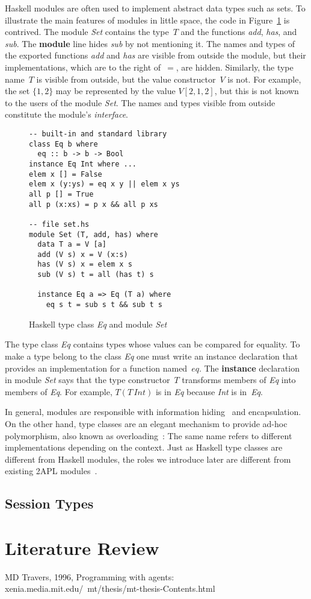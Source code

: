 \documentclass[a4paper,12pt,oneside]{book} %
\theoremstyle{remark}
\theoremstyle{plain}
\begin{document}
Haskell modules are often used to implement abstract data types such as
sets.  To illustrate the main features of modules in little space, the code
in Figure~\ref{fig:haskell} is contrived.  The module \textit{Set} contains
the type~$T$ and the functions \textit{add}, \textit{has}, and
\textit{sub}. The \textbf{module} line hides \textit{sub} by not mentioning
it. The names and types of the exported functions \textit{add} and
\textit{has} are visible from outside the module, but their
implementations, which are to the right of~$=$, are hidden.  Similarly, the
type name~$T$ is visible from outside, but the value constructor~$V$ is
not. For example, the set $\{1,2\}$ may be represented by the value
$V[2,1,2]$, but this is not known to the users of the module \textit{Set}.
The names and types visible from outside constitute the module's
\emph{interface}.

\begin{figure}\footnotesize %
\begin{verbatim}
-- built-in and standard library
class Eq b where
  eq :: b -> b -> Bool
instance Eq Int where ...
elem x [] = False
elem x (y:ys) = eq x y || elem x ys
all p [] = True
all p (x:xs) = p x && all p xs

-- file set.hs
module Set (T, add, has) where
  data T a = V [a]
  add (V s) x = V (x:s)
  has (V s) x = elem x s
  sub (V s) t = all (has t) s

  instance Eq a => Eq (T a) where
    eq s t = sub s t && sub t s
\end{verbatim}
\caption{Haskell type class \textit{Eq} and module \textit{Set}}
\label{fig:haskell}
\end{figure} %


The type class \textit{Eq} contains types whose values can be compared for
equality. To make a type belong to the class \textit{Eq} one must write an
instance declaration that provides an implementation for a function
named~$eq$. The \textbf{instance} declaration in module \textit{Set} says
that the type constructor~$T$ transforms members of \textit{Eq} into
members of \textit{Eq}. For example, $T(T\,\mathit{Int})$ is in \textit{Eq}
because \textit{Int} is in~\textit{Eq}.

In general, modules are responsible with information
hiding~\cite{DBLP:journals/cacm/Parnas72a} and encapsulation.  On the other
hand, type classes are an elegant mechanism to provide ad-hoc polymorphism,
also known as overloading~\cite{DBLP:conf/popl/WadlerB89}: The same name
refers to different implementations depending on the context.  Just as
Haskell type classes are different from Haskell modules, the roles we
introduce later are different from existing 2APL
modules~\cite{dblp:conf/prima/dastanims08}.

\subsection{Session Types}

\section{Literature Review}

MD Travers, 1996, Programming with agents: xenia.media.mit.edu/~mt/thesis/mt-thesis-Contents.html

\end{document}
